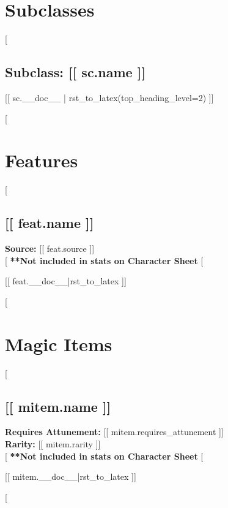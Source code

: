 \section*{Subclasses}
           
[%

  \subsection*{Subclass: [[ sc.name ]]}

  [[ sc.__doc__ | rst_to_latex(top_heading_level=2) ]]

[%
  
\section*{Features}

[%

  \subsection*{[[ feat.name ]]}

  \noindent
  \textbf{Source:} [[ feat.source ]] \\

  [%
    \textbf{**Not included in stats on Character Sheet} %
  [%
             
  [[ feat.__doc__|rst_to_latex ]]

[%

\section*{Magic Items}

[%

  \subsection*{[[ mitem.name ]]}

  \noindent
  \textbf{Requires Attunement:} [[ mitem.requires_attunement ]] \\
  \textbf{Rarity:} [[ mitem.rarity ]] \\

  [%
    \textbf{**Not included in stats on Character Sheet} %
  [%
             
  [[ mitem.__doc__|rst_to_latex ]]

  [%